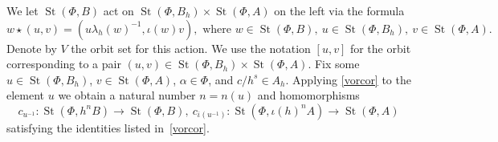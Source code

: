\documentclass[oneside, 11pt]{amsart} \pdfoutput=1
\newcommand{\St}{\mathop{\mathrm{St}}\nolimits}
\numberwithin{equation}{section}
\theoremstyle{definition}
\begin{document}
We let $\St(\Phi, B)$ act on $\St(\Phi, B_h) \times \St(\Phi, A)$ on the left via the formula 
\[w \star (u, v) = (u \lambda_h(w)^{-1}, \iota(w) v),\text{ where }w \in \St(\Phi, B),\ u \in \St(\Phi, B_h),\ v \in \St(\Phi, A).\]
Denote by $V$ the orbit set for this action. We use the notation $[u, v]$ for the orbit corresponding to a pair $(u, v) \in \St(\Phi, B_h) \times \St(\Phi, A)$.
Fix some $u \in \St(\Phi, B_h)$, $v \in \St(\Phi, A)$, $\alpha \in \Phi$, and $c/{h^s} \in A_h$.
Applying \cref{vorcor} to the element $u$ we obtain a natural number $n=n(u)$ and homomorphisms \begin{equation} \label{eq:c-homs} c_{u^{-1}}\colon \St(\Phi, h^nB) \to \St(\Phi, B),\ c_{\overline{\iota}(u^{-1})}\colon \St(\Phi, \iota(h)^nA) \to \St(\Phi, A)\end{equation}
satisfying the identities listed in~\cref{vorcor}.
\end{document}
